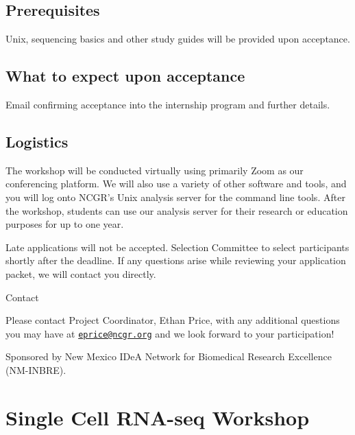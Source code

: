 \documentclass[
]{book}
\begin{document}
\hypertarget{prerequisites}{%
\section*{Prerequisites}\label{prerequisites}}

Unix, sequencing basics and other study guides will be provided upon acceptance.

\hypertarget{what-to-expect-upon-acceptance}{%
\section*{What to expect upon acceptance}\label{what-to-expect-upon-acceptance}}

Email confirming acceptance into the internship program and further details.

\hypertarget{logistics}{%
\section*{Logistics}\label{logistics}}

The workshop will be conducted virtually using primarily Zoom as our conferencing platform. We will also use a variety of other software and tools, and you will log onto NCGR's Unix analysis server for the command line tools. After the workshop, students can use our analysis server for their research or education purposes for up to one year.

Late applications will not be accepted. Selection Committee to select participants shortly after the deadline. If any questions arise while reviewing your application packet, we will contact you directly.

Contact

Please contact Project Coordinator, Ethan Price, with any additional questions you may have at \href{mailto:eprice@ncgr.org}{\nolinkurl{eprice@ncgr.org}} and we look forward to your participation!

Sponsored by New Mexico IDeA Network for Biomedical Research Excellence (NM-INBRE).

\hypertarget{single-cell-rna-seq-workshop}{%
\chapter*{Single Cell RNA-seq Workshop}\label{single-cell-rna-seq-workshop}}
\end{document}
